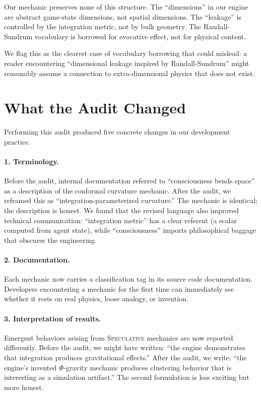 \documentclass[12pt,a4paper]{article}
\begin{document}
Our mechanic preserves none of this structure.  The
``dimensions'' in our engine are abstract game-state dimensions,
not spatial dimensions.  The ``leakage'' is controlled by the
integration metric, not by bulk geometry.  The Randall-Sundrum
vocabulary is borrowed for evocative effect, not for physical
content.

We flag this as the clearest case of vocabulary borrowing that
could mislead: a reader encountering ``dimensional leakage
inspired by Randall-Sundrum'' might reasonably assume a
connection to extra-dimensional physics that does not exist.


\section{What the Audit Changed}
\label{sec:lessons}

Performing this audit produced five concrete changes in our
development practice.

\paragraph{1. Terminology.}
Before the audit, internal documentation referred to ``consciousness
bends space'' as a description of the conformal curvature
mechanic.  After the audit, we reframed this as
``integration-parameterized curvature.''  The mechanic is
identical; the description is honest.  We found that the revised
language also improved technical communication: ``integration
metric'' has a clear referent (a scalar computed from agent
state), while ``consciousness'' imports philosophical baggage
that obscures the engineering.

\paragraph{2. Documentation.}
Each mechanic now carries a classification tag in its source
code documentation.  Developers encountering a mechanic for
the first time can immediately see whether it rests on real
physics, loose analogy, or invention.

\paragraph{3. Interpretation of results.}
Emergent behaviors arising from \textsc{Speculative} mechanics
are now reported differently.  Before the audit, we might have
written: ``the engine demonstrates that integration produces
gravitational effects.''  After the audit, we write: ``the
engine's invented $\Phi$-gravity mechanic produces clustering
behavior that is interesting as a simulation artifact.''  The
second formulation is less exciting but more honest.
\end{document}
